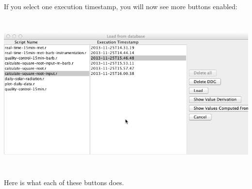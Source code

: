 \documentclass[12pt]{article}
\begin{document}
{{\mdseries\upshape\color{black}
If you select one execution timestamp, you will now see more buttons enabled:}

 \includegraphics[width=6.5in,height=3.25in]{UsingDDGExplorer-img/UsingDDGExplorer-img007.png} 

{\mdseries\upshape\color{black}
Here is what each of these buttons does.}

}
\end{document}

